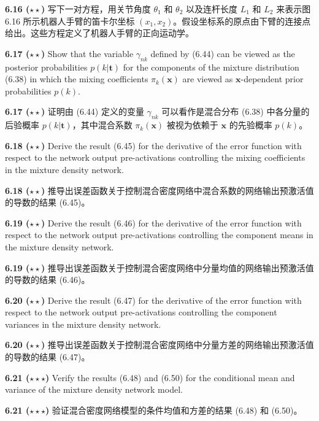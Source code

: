 \documentclass{article}
\begin{document}
\textbf{6.16 ($\star\star$)} 写下一对方程，用关节角度 $\theta_1$ 和 $\theta_2$ 以及连杆长度 $L_1$ 和 $L_2$ 来表示图 6.16 所示机器人手臂的笛卡尔坐标 $(x_1, x_2)$。假设坐标系的原点由下臂的连接点给出。这些方程定义了机器人手臂的正向运动学。

\vspace{1em}

\textbf{6.17 ($\star\star$)} Show that the variable $\gamma_{nk}$ defined by (6.44) can be viewed as the posterior probabilities $p(k|\mathbf{t})$ for the components of the mixture distribution (6.38) in which the mixing coefficients $\pi_k(\mathbf{x})$ are viewed as $\mathbf{x}$-dependent prior probabilities $p(k)$.

\textbf{6.17 ($\star\star$)} 证明由 (6.44) 定义的变量 $\gamma_{nk}$ 可以看作是混合分布 (6.38) 中各分量的后验概率 $p(k|\mathbf{t})$，其中混合系数 $\pi_k(\mathbf{x})$ 被视为依赖于 $\mathbf{x}$ 的先验概率 $p(k)$。

\vspace{1em}

\textbf{6.18 ($\star\star$)} Derive the result (6.45) for the derivative of the error function with respect to the network output pre-activations controlling the mixing coefficients in the mixture density network.

\textbf{6.18 ($\star\star$)} 推导出误差函数关于控制混合密度网络中混合系数的网络输出预激活值的导数的结果 (6.45)。

\vspace{1em}

\textbf{6.19 ($\star\star$)} Derive the result (6.46) for the derivative of the error function with respect to the network output pre-activations controlling the component means in the mixture density network.

\textbf{6.19 ($\star\star$)} 推导出误差函数关于控制混合密度网络中分量均值的网络输出预激活值的导数的结果 (6.46)。

\vspace{1em}

\textbf{6.20 ($\star\star$)} Derive the result (6.47) for the derivative of the error function with respect to the network output pre-activations controlling the component variances in the mixture density network.

\textbf{6.20 ($\star\star$)} 推导出误差函数关于控制混合密度网络中分量方差的网络输出预激活值的导数的结果 (6.47)。

\vspace{1em}

\textbf{6.21 ($\star\star\star$)} Verify the results (6.48) and (6.50) for the conditional mean and variance of the mixture density network model.

\textbf{6.21 ($\star\star\star$)} 验证混合密度网络模型的条件均值和方差的结果 (6.48) 和 (6.50)。
\end{document}
